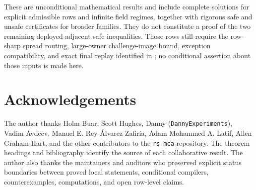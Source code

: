 \documentclass[11pt,a4paper]{amsart}
\numberwithin{equation}{section}
\theoremstyle{remark}
\begin{document}
These are unconditional mathematical results and include complete solutions for explicit admissible rows and infinite field regimes, together with rigorous safe and unsafe certificates for broader families.  They do not constitute a proof of the two remaining deployed adjacent safe inequalities.  Those rows still require the row-sharp spread routing, large-owner challenge-image bound, exception compatibility, and exact final replay identified in \cite{ChoGF26,ChoComp26}; no conditional assertion about those inputs is made here.

\section*{Acknowledgements}
The author thanks Holm Buar, Scott Hughes, Danny (\texttt{DannyExperiments}), Vadim Avdeev, Manuel E. Rey-\'Alvarez Zafiria, Adam Mohammed A. Latif, Allen Graham Hart, and the other contributors to the \texttt{rs-mca} repository.  The theorem headings and bibliography identify the source of each collaborative result.  The author also thanks the maintainers and auditors who preserved explicit status boundaries between proved local statements, conditional compilers, counterexamples, computations, and open row-level claims.
\end{document}
